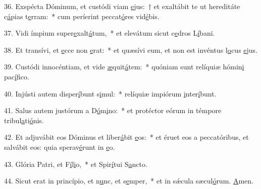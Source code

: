 36. Exspécta Dóminum, et custódi viam \uline{e}jus:~† et exaltábit te ut hereditáte c\uline{á}pias t\uline{e}rram:~* cum períerint peccat\uline{ó}res vid\uline{é}bis.\par 
37. Vidi ímpium super\uline{e}xalt\uline{á}tum,~* et elevátum sicut c\uline{e}dros L\uline{í}bani.\par 
38. Et transívi, et \uline{e}cce non \uline{e}rat:~* et quæsívi eum, et non est invéntus l\uline{o}cus \uline{e}jus.\par 
39. Custódi innocéntiam, et vide \uline{æ}quit\uline{á}tem:~* quóniam sunt relíquiæ hómin\uline{i} pac\uline{í}fico.\par 
40. Injústi autem disper\uline{í}bunt s\uline{i}mul:~* relíquiæ impiórum \uline{i}nter\uline{í}bunt.\par 
41. Salus autem justórum a D\uline{ó}m\uline{i}no:~* et protéctor eórum in témpore tribul\uline{a}ti\uline{ó}nis.\par 
42. Et adjuvábit eos Dóminus et liber\uline{á}bit \uline{e}os:~* et éruet eos a peccatóribus, et salvábit eos: quia sperav\uline{é}runt in \uline{e}o.\par 
43. Glória Patri, et F\uline{í}l\uline{i}o,~* et Spir\uline{í}tui S\uline{a}ncto.\par 
44. Sicut erat in princípio, et n\uline{u}nc, et s\uline{e}mper,~* et in sǽcula sæcul\uline{ó}rum. \uline{A}men.\par 

